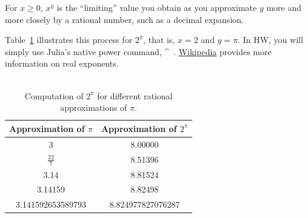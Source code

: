 %




\begin{tcolorbox}[colback = mylightblue, title = {What is $x^y$, when the exponent, $y$, is a real number?}, breakable]

\begin{definition}
    For $x\ge 0$, $x^y$ is the ``limiting'' value you obtain as you approximate $y$ more and more closely by a rational number, such as a decimal expansion.
\end{definition}  
 
 Table~\ref{table:xPowerPi} illustrates this process for $2 ^ \pi$, that is, $x=2$ and $y=\pi$. In HW, you will simply use Julia's native power command, \textasciicircum~. \href{https://en.wikipedia.org/wiki/Exponentiation}{Wikipedia} provides more information on real exponents.\\\
\end{tcolorbox}

\begin{table}[htb]
\centering
\begin{tabular}{|c|c|}
\hline
Approximation of $\pi$ & Approximation of $2^{\pi}$  \\
\hline
\hline
3 &  {8.00000}\\
\hline
$\frac{22}{7}$ &  {8.51396}\\
\hline
3.14 &  {8.81524}\\
\hline
3.14159 &  {8.82498}\\
\hline
3.141592653589793 &  {8.824977827076287}\\
\hline
\end{tabular}
\caption{Computation of $2^{\pi}$ for different rational approximations of $\pi$.}
\label{table:xPowerPi}
\end{table}



